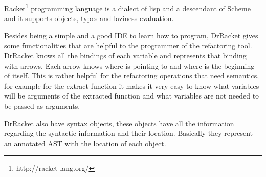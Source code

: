 Racket\footnote{http://racket-lang.org/} programming language is a dialect of lisp and a descendant of Scheme and it supports objects, types and laziness evaluation.


Besides being a simple and a good IDE to learn how to program, DrRacket gives some functionalities that are helpful to the programmer of the refactoring tool. DrRacket knows all the bindings of each variable and represents that binding with arrows. Each arrow knows where is pointing to and where is the beginning of itself. This is rather helpful for the refactoring operations that need semantics, for example for the extract-function it makes it very easy to know what variables will be arguments of the extracted function and what variables are not needed to be passed as arguments.

DrRacket also have syntax objects, these objects have all the information regarding the syntactic information and their location. Basically they represent an annotated AST with the location of each object.



